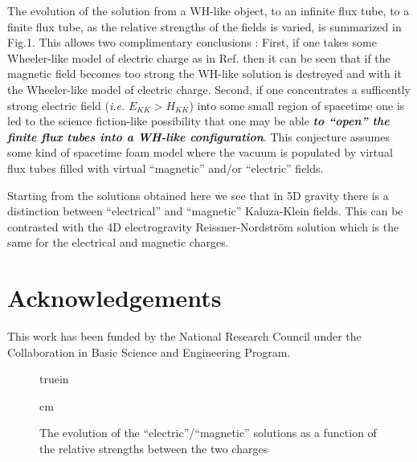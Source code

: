\par 
The evolution of the solution from a WH-like object, to
an infinite flux tube, to a finite flux tube, as the
relative strengths of the fields is varied, is summarized in
Fig.1. This allows two complimentary conclusions :
First, if one takes some Wheeler-like model of electric
charge as in Ref. \cite{dzh3} then it can be seen that
if the magnetic field becomes too strong the WH-like
solution is destroyed and with it the Wheeler-like
model of electric charge.
Second, if one concentrates a sufficently strong electric
field ({\it i.e.} $E_{KK} > H_{KK}$) into some small region 
of spacetime one is led to the science fiction-like 
possibility that one may be able 
\textit{\textbf{to ``open'' the finite
flux tubes into a WH-like configuration}}. This 
conjecture assumes some kind of spacetime foam model
where the vacuum is populated by virtual flux tubes
filled with virtual ``magnetic'' and/or ``electric''
fields.
\par 
Starting from the solutions obtained here we see that in 5D 
gravity there is a distinction between ``electrical'' and 
``magnetic'' Kaluza-Klein fields. This can be contrasted
with the 4D electrogravity Reissner-Nordstr\"om solution 
which is the same for the electrical and magnetic charges. 

\section{Acknowledgements} 

This work has been funded by the
National Research Council under the Collaboration
in Basic Science and Engineering Program.


\begin{figure}[ht]	%
\centerline{ truein }   
 cm
\caption[]{
\label{whfig}
\small The evolution of the ``electric''/``magnetic'' solutions
as a function of the relative strengths between the two charges}
\end{figure}


